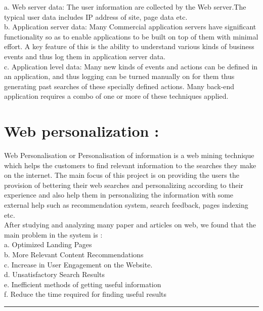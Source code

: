 a. Web server data: The user information are collected by the Web server.The typical user data includes IP address of site, page data etc.\\
b. Application server data: Many Commercial application servers have significant functionality so as to enable applications to be built on top of them with minimal effort. A key feature of this is the ability to understand various kinds of business events and thus log them in application server data.\\
c. Application level data: Many new kinds of events and actions can be defined in an application, and thus logging can be turned manually on  for them thus generating past searches of these specially defined actions. Many back-end application requires a combo of one or more of these techniques applied.\\
\section{Web personalization :}
Web Personalisation or Personalisation of information is a
web mining technique which helps the customers to find
relevant information to the searches they make on the internet.
The main focus of this project is on providing the users the
provision of bettering their web searches and personalizing
according to their experience and also help them in
personalizing the information with some external help such as
recommendation system, search feedback, pages indexing etc.\\
After studying and analyzing many paper and articles on web,
we found that the main problem in the system is :\\
a. Optimized Landing Pages\\
b. More Relevant Content Recommendations\\
c. Increase in User Engagement on the Website.\\
d. Unsatisfactory Search Results\\
e. Inefficient methods of getting useful information\\
f. Reduce the time required for finding useful results\\
\vspace{10mm}
\hrule